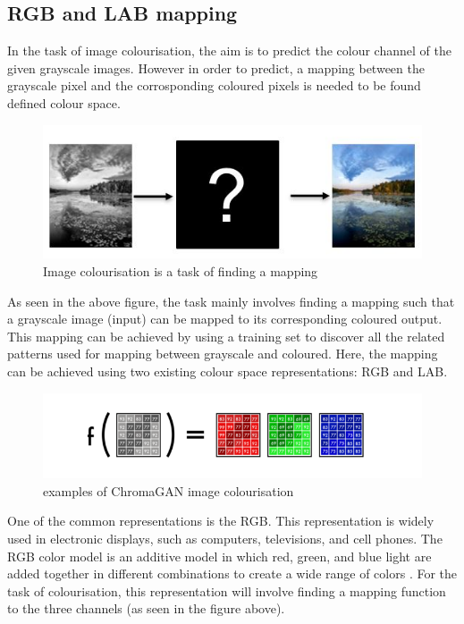 \subsection{RGB and LAB mapping}
In the task of image colourisation, the aim is to predict the colour channel of the given grayscale images. However in order to predict, a mapping between the grayscale pixel and the corrosponding coloured pixels is needed to be found defined colour space. 

\begin{figure}[H]
    \centering
    \includegraphics[width=0.7\columnwidth]{sections/figures/mapping.JPG}
    \caption{Image colourisation is a task of finding a mapping}
    \label{fig:my_label}
\end{figure}
As seen in the above figure, the task mainly involves finding a mapping such that a grayscale image (input) can be mapped to its corresponding coloured output. This mapping can be achieved by using a training set to discover all the related patterns used for mapping between grayscale and coloured. Here, the mapping can be achieved using two existing colour space representations: RGB and LAB.


\begin{figure}[H]
    \centering
    \includegraphics[width=0.6\columnwidth]{sections/figures/rgb.png}
    \caption{examples of ChromaGAN image colourisation \cite{wallner_2021}}
    \label{fig:my_label}
\end{figure}
One of the common representations is the RGB. This representation is widely used in electronic displays, such as computers, televisions, and cell phones. The RGB color model is an additive model in which red, green, and blue light are added together in different combinations to create a wide range of colors \cite{enwiki:1080368112}. For the task of colourisation, this representation will involve finding a mapping function to the three channels (as seen in the figure above). 


